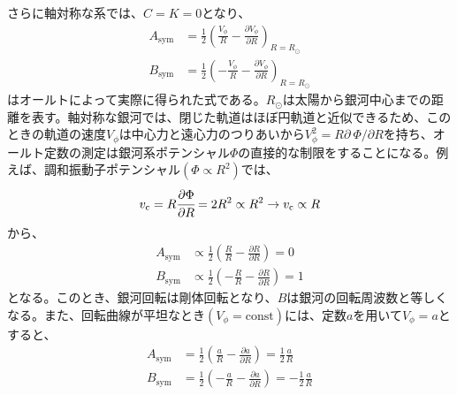 さらに軸対称な系では、$C=K=0$となり、
\begin{subequations}
\begin{align}
	A_{\mathrm{sym}} &=\frac{1}{2}\left( \frac{V_{\phi}}{R} - \frac{\partial V_{\phi}}{\partial R} \right)_{R=R_{\odot}} \\
	B_{\mathrm{sym}} &=\frac{1}{2}\left( -\frac{V_{\phi}}{R} - \frac{\partial V_{\phi}}{\partial R} \right)_{R=R_{\odot}}
\end{align} \label{ABsym}
\end{subequations}
はオールトによって実際に得られた式である。$R_{\odot}$は太陽から銀河中心までの距離を表す。軸対称な銀河では、閉じた軌道はほぼ円軌道と近似できるため、このときの軌道の速度$V_{\phi}$は中心力と遠心力のつりあいから$V_{\phi}^2=R \partial\ \Phi/\partial R$を持ち、オールト定数の測定は銀河系ポテンシャル$\Phi$の直接的な制限をすることになる。例えば、調和振動子ポテンシャル$(\Phi \propto R^2)$では、
\begin{align}
\begin{aligned}
    v_{\mathrm{c}} = R \cfrac{\partial \Phi}{\partial R} = 2R^2 \propto R^2 \to v_{\mathrm{c}} \propto R
\end{aligned}
\end{align}
から、
\begin{subequations}
\begin{align}
	A_{\mathrm{sym}} &\propto\frac{1}{2}\left( \frac{R}{R} - \frac{\partial R}{\partial R} \right) = 0\\
	B_{\mathrm{sym}} &\propto \frac{1}{2}\left( -\frac{R}{R} - \frac{\partial R}{\partial R} \right) = 1
\end{align}
\end{subequations}
となる。このとき、銀河回転は剛体回転となり、$B$は銀河の回転周波数と等しくなる。また、回転曲線が平坦なとき$(V_{\phi}=\mathrm{const})$には、定数$a$を用いて$V_{\phi} = a$とすると、
\begin{subequations}
\begin{align}
	A_{\mathrm{sym}} &=\frac{1}{2}\left( \frac{a}{R} - \frac{\partial a}{\partial R} \right) = \frac{1}{2}\frac{a}{R}\\
	B_{\mathrm{sym}} &=\frac{1}{2}\left( -\frac{a}{R} - \frac{\partial a}{\partial R} \right) = -\frac{1}{2}\frac{a}{R}
\end{align}
\end{subequations}
